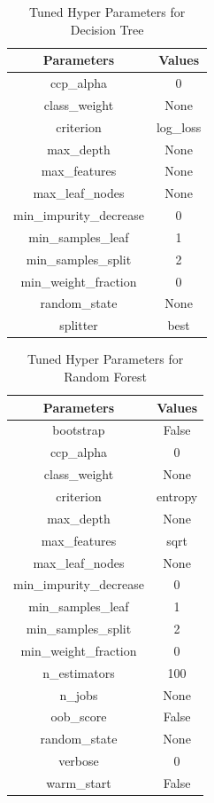 \documentclass[conference]{IEEEtran}
\begin{document}
\begin{table}[!ht]
    \caption{Tuned Hyper Parameters for Decision Tree}
    \centering
    \begin{tabular}{c c}
        \hline 
        \bfseries Parameters & \bfseries Values\\
        \hline  \hline
        ccp\_alpha & 0\\
        class\_weight & None\\
        criterion & log\_loss\\
        max\_depth & None\\
        max\_features & None\\
        max\_leaf\_nodes & None\\
        min\_impurity\_decrease & 0\\
        min\_samples\_leaf & 1\\
        min\_samples\_split & 2\\
        min\_weight\_fraction & 0 \\
        random\_state & None\\
        splitter & best\\
        \hline
    \end{tabular}
\end{table}

\begin{table}[!ht]
    \caption{Tuned Hyper Parameters for Random Forest}
    \centering
    \begin{tabular}{c c}
        \hline 
        \bfseries Parameters & \bfseries Values\\
        \hline  \hline
        bootstrap & False \\
        ccp\_alpha & 0\\
        class\_weight & None\\
        criterion & entropy\\
        max\_depth & None\\
        max\_features & sqrt\\
        max\_leaf\_nodes & None\\
        min\_impurity\_decrease & 0\\
        min\_samples\_leaf & 1\\
        min\_samples\_split & 2\\
        min\_weight\_fraction & 0 \\
        n\_estimators & 100\\
        n\_jobs & None\\
        oob\_score & False \\
        random\_state & None\\
        verbose & 0\\
        warm\_start & False\\
        \hline
    \end{tabular}
\end{table}
\end{document}
